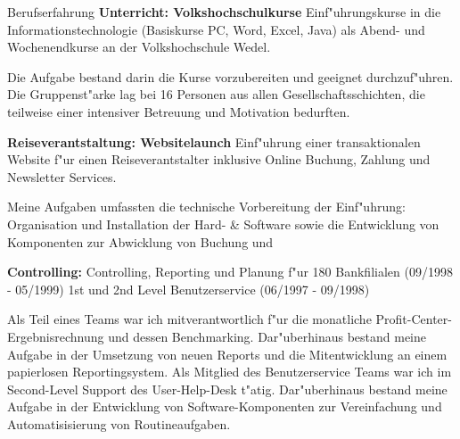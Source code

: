 \begin{rubric}{Berufserfahrung}
\entry*[09/1997 - 05/2001] \textbf{Unterricht: Volkshochschulkurse}\newline
{} 
Einf"uhrungskurse in die Informationstechnologie (Basiskurse PC, Word, Excel, Java) als Abend- und Wochenendkurse an der Volkshochschule Wedel.\axelvspace

Die Aufgabe bestand darin die Kurse vorzubereiten und geeignet durchzuf"uhren. Die Gruppenst"arke lag bei 16 Personen aus allen Gesellschaftsschichten, die teilweise einer intensiver Betreuung und Motivation bedurften. 

\entry*[06/1999 - 10/1999] \textbf{Reiseverantstaltung: Websitelaunch}\newline
{} 
Einf"uhrung einer transaktionalen Website f"ur einen Reiseverantstalter inklusive Online Buchung, Zahlung und Newsletter Services.\axelvspace

Meine Aufgaben umfassten die technische Vorbereitung der Einf"uhrung: Organisation und Installation der Hard- \& Software sowie die Entwicklung von Komponenten zur Abwicklung von Buchung und %



\entry*[06/1997 - 05/1999] \textbf{Controlling:}\newline
{} 
Controlling, Reporting und Planung f"ur 180 Bankfilialen (09/1998 - 05/1999)\newline
1st und 2nd Level Benutzerservice (06/1997 - 09/1998)\axelvspace

Als Teil eines Teams war ich mitverantwortlich f"ur die monatliche Profit-Center-Ergebnisrechnung und dessen Benchmarking. Dar"uberhinaus bestand meine Aufgabe in der Umsetzung von neuen Reports und die Mitentwicklung an einem papierlosen Reportingsystem.
Als Mitglied des Benutzerservice Teams war ich im Second-Level Support des User-Help-Desk t"atig. Dar"uberhinaus bestand meine Aufgabe in der Entwicklung von Software-Komponenten zur Vereinfachung und Automatisisierung von Routineaufgaben.
\sloppy
\end{rubric}

